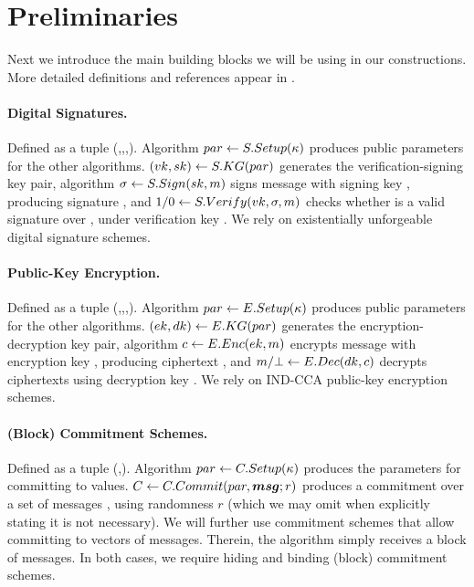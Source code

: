 \section{Preliminaries}
\label{sec:preliminaries}



Next we introduce the main building blocks we will be using in our
constructions. More detailed definitions and references appear in
.

\paragraph{Digital Signatures.} %
Defined as a tuple (\SSetup,\SKeyGen,\SSign,\SVerify). Algorithm $par \gets
S.Setup(\kappa)$ produces public parameters for the other algorithms.
$(vk,sk) \gets S.KG(par)$ generates the verification-signing key
pair, algorithm $\sigma \gets S.Sign(sk,m)$ signs message \msg with
signing key \Ssk, producing signature \Ssig, and $1/0 \gets S.Verify(vk,
\sigma,m)$ checks whether \Ssig is a valid signature over \msg, under
verification key \Svk. We rely on existentially unforgeable digital signature
schemes.

\paragraph{Public-Key Encryption.} %
Defined as a tuple (\ESetup,\EKeyGen,\EEnc,\EDec). Algorithm $par \gets
E.Setup(\kappa)$ produces public parameters for the other algorithms.
$(ek,dk) \gets E.KG(par)$ generates the encryption-decryption key
pair, algorithm $c \gets E.Enc(ek,m)$ encrypts message \msg with
encryption key \Eek, producing ciphertext \Ec, and $m/\bot \gets E.Dec(dk,
c)$ decrypts ciphertexts using decryption key \Edk. We rely on IND-CCA
public-key encryption schemes.

\paragraph{(Block) Commitment Schemes.} %
Defined as a tuple (\CSetup,\CCommit). Algorithm $par \gets
C.Setup(\kappa)$ produces the parameters for committing to values. $C
\gets C.Commit(par, \boldsymbol{msg}; r)$ produces a commitment \Ccom over a set of
messages \smsg, using randomness $r$ (which we may omit when explicitly
stating it is not necessary). We will further use commitment schemes that
allow committing to vectors of messages. Therein, the \CCommit algorithm simply
receives a block of messages. In both cases, we require hiding and binding
(block) commitment schemes.


